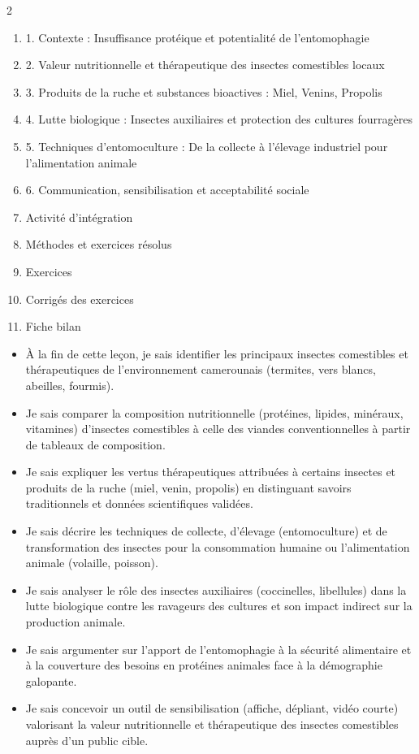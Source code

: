 \documentclass[11pt]{article}
\begin{document}
\begin{sommaire}
\begin{multicols}{2}
\begin{enumerate}
\item 1. Contexte : Insuffisance protéique et potentialité de l'entomophagie
\item 2. Valeur nutritionnelle et thérapeutique des insectes comestibles locaux
\item 3. Produits de la ruche et substances bioactives : Miel, Venins, Propolis
\item 4. Lutte biologique : Insectes auxiliaires et protection des cultures fourragères
\item 5. Techniques d'entomoculture : De la collecte à l'élevage industriel pour l'alimentation animale
\item 6. Communication, sensibilisation et acceptabilité sociale
\item Activité d'intégration
\item Méthodes et exercices résolus
\item Exercices
\item Corrigés des exercices
\item Fiche bilan
\end{enumerate}
\end{multicols}
\end{sommaire}

\begin{objectifs}
\begin{itemize}
\item À la fin de cette leçon, je sais identifier les principaux insectes comestibles et thérapeutiques de l'environnement camerounais (termites, vers blancs, abeilles, fourmis).
\item Je sais comparer la composition nutritionnelle (protéines, lipides, minéraux, vitamines) d'insectes comestibles à celle des viandes conventionnelles à partir de tableaux de composition.
\item Je sais expliquer les vertus thérapeutiques attribuées à certains insectes et produits de la ruche (miel, venin, propolis) en distinguant savoirs traditionnels et données scientifiques validées.
\item Je sais décrire les techniques de collecte, d'élevage (entomoculture) et de transformation des insectes pour la consommation humaine ou l'alimentation animale (volaille, poisson).
\item Je sais analyser le rôle des insectes auxiliaires (coccinelles, libellules) dans la lutte biologique contre les ravageurs des cultures et son impact indirect sur la production animale.
\item Je sais argumenter sur l'apport de l'entomophagie à la sécurité alimentaire et à la couverture des besoins en protéines animales face à la démographie galopante.
\item Je sais concevoir un outil de sensibilisation (affiche, dépliant, vidéo courte) valorisant la valeur nutritionnelle et thérapeutique des insectes comestibles auprès d'un public cible.
\end{itemize}
\end{objectifs}
\end{document}
